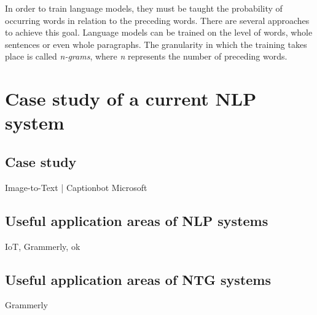 In order to train language models, they must be taught the probability of occurring words in relation to the preceding words. There are several approaches to achieve this goal. Language models can be trained on the level of words, whole sentences or even whole paragraphs. The granularity in which the training takes place is called \textit{n-grams}, where \textit{n} represents the number of preceding words.

\section{Case study of a current NLP system}

\subsection{Case study}

Image-to-Text | Captionbot Microsoft

\subsection{Useful application areas of NLP systems}

IoT, Grammerly, ok

\subsection{Useful application areas of NTG systems}

Grammerly